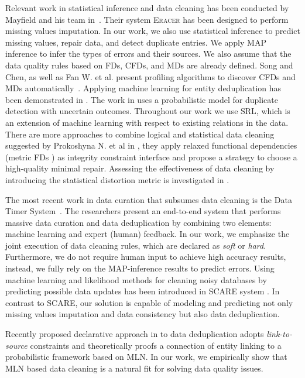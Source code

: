 Relevant work in statistical inference and data cleaning has been conducted by Mayfield and his team in~\cite{Mayfield:2010:EDA:1807167.1807178}. Their system \textsc{Eracer} has been designed to perform missing values imputation. In our work, we also use statistical inference to predict missing values, repair data, and detect duplicate entries. We apply MAP inference to infer the types of errors and their sources. We also assume that the data quality rules based on FDs, CFDs, and MDs are already defined. Song and Chen, as well as Fan W. et al. present profiling algorithms to discover CFDs and MDs automatically~\cite{song2009discovering,Fan:2011:DCF:1978258.1978514}. Applying machine learning for entity deduplication has been demonstrated in \cite{guo2010record}. The work in \cite{beskales2010probclean} uses a probabilistic model for duplicate detection with uncertain outcomes. Throughout our work we use SRL, which is an extension of machine learning with respect to existing relations in the data. There are more approaches to combine logical and statistical data cleaning suggested by Prokoshyna N. et al in \cite{prokoshyna2015combining}, they apply relaxed functional dependencies (metric FDs \cite{Koudas2009MFD, caruccio2016relaxed}) as integrity constraint interface and propose a strategy to choose a high-quality minimal repair. Assessing the effectiveness of data cleaning by introducing the statistical distortion metric is investigated in \cite{dasu2012statistical}. 

The most recent work in data curation that subsumes data cleaning is the Data Timer System~\cite{Stonebraker_datacuration}. The researchers present an end-to-end system that performs massive data curation and data deduplication by combining two elements: machine learning and expert (human) feedback. In our work, we emphasize the joint execution of data cleaning rules, which are declared as \textit{soft} or \textit{hard}. Furthermore, we do not require human input to achieve high accuracy results, instead, we fully rely on the MAP-inference results to predict errors. Using machine learning and likelihood methods for cleaning noisy databases by predicting possible data updates has been introduced in \textsc{SCARE} system \cite{Yakout:2013:DSU:2463676.2463706}. In contrast to \textsc{SCARE}, our solution is capable of modeling and predicting not only missing values imputation and data consistency but also data deduplication.

Recently proposed declarative approach in \cite{burdick2015MLN} to data deduplication adopts \textit{link-to-source} constraints and theoretically proofs a connection of entity linking to a probabilistic framework based on MLN. In our work, we empirically show that MLN based data cleaning is a natural fit for solving data quality issues. 

